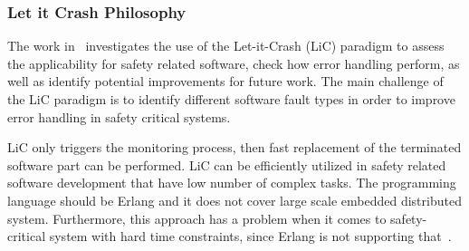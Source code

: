 \subsubsection{Let it Crash Philosophy}
The work in~\cite{woskowskiassessing} investigates the use of the Let-it-Crash (LiC) paradigm to assess the applicability for safety related software, check how error handling perform, as well as identify potential improvements for future work. %
The main challenge of the LiC paradigm is to identify different software fault types in order to improve error handling in safety critical systems. 
 
 
LiC only triggers the monitoring process, then fast replacement of the terminated software part can be performed. 
LiC can be efficiently utilized in safety related software development that have low number of complex tasks. The programming language should be Erlang and it does not cover large scale embedded distributed system. Furthermore, this approach has a problem when it comes to safety-critical system with hard time constraints, since Erlang is not supporting that~\cite{woskowskiassessing}. 


